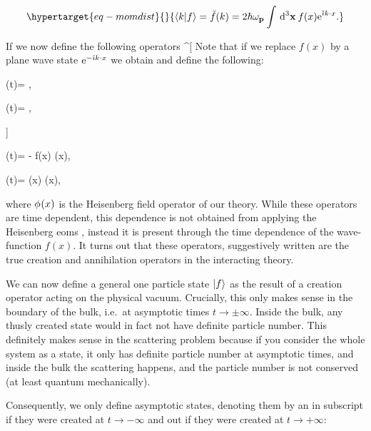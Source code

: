\documentclass[
  11pt,
  a4paper,
  DIV=11,
  numbers=noendperiod,
  oneside]{scrreprt}
\let\[\relax \let\]\relax %
\DeclareRobustCommand{\[}{\begin{equation}}
\DeclareRobustCommand{\]}{\end{equation}}
\begin{document}
\begin{equation}\protect\hypertarget{eq-momdist}{}{\ip{k}{f}=\shellft{f}(k)= 2 \hbar\shellen \int \dd[3]{\tv{x}}f(x) \exp{\im k\cdot x}.}\label{eq-momdist}\end{equation}

If we now define the following operators 
\^{}{[} Note that if we replace \(f(x)\) by a plane wave state
\(\mathrm{e}^{-\mathring{\imath} k\cdot x}\) we obtain and define the following:

\[
\createop[\tv{k}](t)=  \int {}  ,
\]

\[
\annihilop[\tv{k}](t)=   \int {}  ,
\]

{]}

\[
\createop[f](t)= -  \im \int {}f(x) \lrder[0] \scf(x),
\]

\[
\annihilop[f](t)=   \im \int {}(x) \lrder[0] \scf(x),
\]

where \(\phi_{}(x)\) is the Heisenberg field operator of our theory. While
these operators are time dependent, this dependence is not obtained from
applying the Heisenberg \glspl{eom} ,
instead it is present through the time dependence of the wave-function
\(f(x)\). It turns out that these operators, suggestively written are
the true creation and annihilation operators in the interacting theory.

We can now define a general one particle state \(\vert f \rangle_{\text{}}\) as the result
of a creation operator acting on the physical vacuum. Crucially, this
only makes sense in the boundary of the bulk, i.e.~at asymptotic times
\(t\to\pm\infty\). Inside the bulk, any thusly created state
would in fact not have definite particle number. This definitely makes
sense in the scattering problem because if you consider the whole system
as a state, it only has definite particle number at asymptotic times,
and inside the bulk the scattering happens, and the particle number is
not conserved (at least quantum mechanically).

Consequently, we only define asymptotic states, denoting them by an
\(\text{in}\) subscript if they were created at \(t\to-\infty\) and
\(\text{out}\) if they were created at \(t\to+\infty\):
\end{document}
